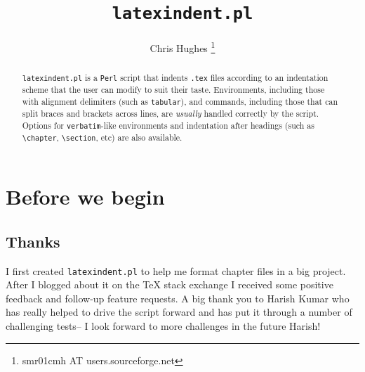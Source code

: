 


\title{\lstinline[basicstyle=\huge\ttfamily]!latexindent.pl!}
\author{Chris Hughes \footnote{smr01cmh AT users.sourceforge.net}}
\maketitle
\begin{abstract}
	\lstinline!latexindent.pl! is a \lstinline!Perl! script that indents \lstinline!.tex!
	files according to an indentation scheme that the user can modify to suit their 
	taste. Environments, including those with alignment delimiters (such as \lstinline!tabular!), 
	and commands, including those that can split braces and brackets across lines, 
	are \emph{usually} handled correctly by the script. Options for \lstinline!verbatim!-like
	environments and indentation after headings (such as \lstinline!\chapter!, \lstinline!\section!, etc) 
	are also available.
\end{abstract}

\tableofcontents
\lstlistoflistings

\section{Before we begin}
\subsection{Thanks}
I first created \lstinline!latexindent.pl! to help me format chapter files 
in a big project. After I blogged about it on the 
\TeX{} stack exchange \cite{cmhblog} I received some positive feedback and 
follow-up feature requests. A big thank you to Harish Kumar who has really 
helped to drive the script forward and has put it through a number of challenging
tests-- I look forward to more challenges in the future Harish!
 	 	 	 	 	
